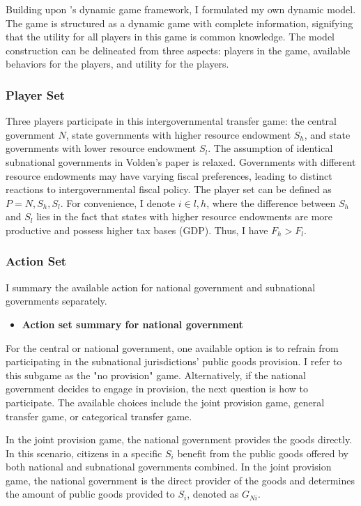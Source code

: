 Building upon \Textcite{volden2007intergovernmental}'s dynamic game framework, I formulated my own dynamic model. The game is structured as a dynamic game with complete information, signifying that the utility for all players in this game is common knowledge. The model construction can be delineated from three aspects: players in the game, available behaviors for the players, and utility for the players.

\subsubsection{Player Set}

Three players participate in this intergovernmental transfer game: the central government $N$\label{player}, state governments with higher resource endowment $S_h$, and state governments with lower resource endowment $S_l$. The assumption of identical subnational governments in Volden's paper is relaxed. Governments with different resource endowments may have varying fiscal preferences, leading to distinct reactions to intergovernmental fiscal policy. The player set can be defined as $P = { N, S_h, S_l}$. For convenience, I denote $i\in {l,h}$, where the difference between $S_h$ and $S_l$ lies in the fact that states with higher resource endowments are more productive and possess higher tax bases (GDP). Thus, I have $F_h>F_l$.%

\subsubsection{Action Set}
I summary the available action for national government and subnational governments separately.

\begin{itemize}
    \item \textbf{Action set summary for national government}
\end{itemize}

For the central or national government, one available option is to refrain from participating in the subnational jurisdictions' public goods provision. I refer to this subgame as the "no provision" game. Alternatively, if the national government decides to engage in provision, the next question is how to participate. The available choices include the joint provision game, general transfer game, or categorical transfer game.

In the joint provision game, the national government provides the goods directly. In this scenario, citizens in a specific $S_i$ benefit from the public goods offered by both national and subnational governments combined. In the joint provision game, the national government is the direct provider of the goods and determines the amount of public goods provided to $S_i$, denoted as $G_{Ni}$.%

